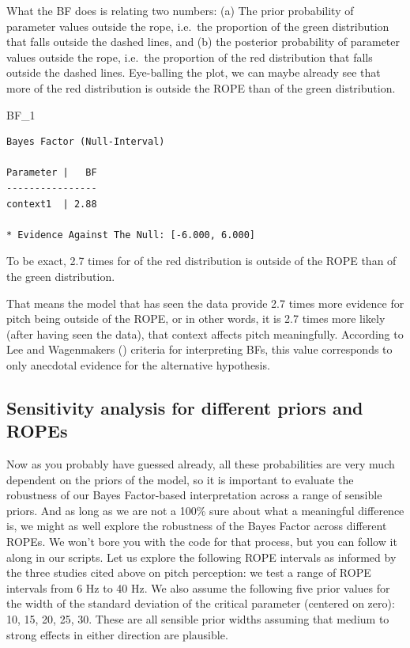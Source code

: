 \documentclass[
  doc,
  floatsintext,
  longtable,
  nolmodern,
  notxfonts,
  notimes,
  colorlinks=true,linkcolor=blue,citecolor=blue,urlcolor=blue]{apa7}
\newenvironment{Shaded}{\begin{snugshade}}{\end{snugshade}}
\newcommand{\NormalTok}[1]{\textcolor[rgb]{0.00,0.23,0.31}{#1}}
\begin{document}
What the BF does is relating two numbers: (a) The prior probability of
parameter values outside the rope, i.e.~the proportion of the green
distribution that falls outside the dashed lines, and (b) the posterior
probability of parameter values outside the rope, i.e.~the proportion of
the red distribution that falls outside the dashed lines. Eye-balling
the plot, we can maybe already see that more of the red distribution is
outside the ROPE than of the green distribution.

\begin{Shaded}
\begin{Highlighting}[]
\NormalTok{BF\_1}
\end{Highlighting}
\end{Shaded}

\begin{verbatim}
Bayes Factor (Null-Interval)

Parameter |   BF
----------------
context1  | 2.88

* Evidence Against The Null: [-6.000, 6.000]
\end{verbatim}

To be exact, 2.7 times for of the red distribution is outside of the
ROPE than of the green distribution.

That means the model that has seen the data provide 2.7 times more
evidence for pitch being outside of the ROPE, or in other words, it is
2.7 times more likely (after having seen the data), that context affects
pitch meaningfully. According to Lee and Wagenmakers
() criteria for
interpreting BFs, this value corresponds to only anecdotal evidence for
the alternative hypothesis.

\subsection{Sensitivity analysis for different priors and
ROPEs}\label{sensitivity-analysis-for-different-priors-and-ropes}

Now as you probably have guessed already, all these probabilities are
very much dependent on the priors of the model, so it is important to
evaluate the robustness of our Bayes Factor-based interpretation across
a range of sensible priors. And as long as we are not a 100\% sure about
what a meaningful difference is, we might as well explore the robustness
of the Bayes Factor across different ROPEs. We won't bore you with the
code for that process, but you can follow it along in our scripts. Let
us explore the following ROPE intervals as informed by the three studies
cited above on pitch perception: we test a range of ROPE intervals from
6 Hz to 40 Hz. We also assume the following five prior values for the
width of the standard deviation of the critical parameter (centered on
zero): 10, 15, 20, 25, 30. These are all sensible prior widths assuming
that medium to strong effects in either direction are plausible.
\end{document}
